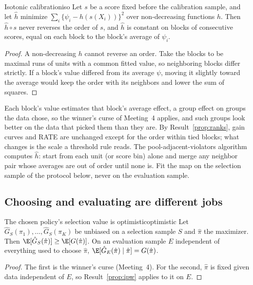 \documentclass[11pt]{article}
\begin{document}
\begin{prop}{Isotonic calibration}{iso}
Let $s$ be a score fixed before the calibration sample, and let $\hat h$ minimize $\sum_i\{\psi_i - h(s(X_i))\}^2$ over
non-decreasing functions $h$. Then $\hat h \circ s$ never reverses the order of $s$, and $\hat h$ is constant on blocks of
consecutive scores, equal on each block to the block's average of $\psi_i$.
\end{prop}
\begin{proof}
A non-decreasing $h$ cannot reverse an order. Take the blocks to be maximal runs of units with a common fitted value, so
neighboring blocks differ strictly. If a block's value differed from its average $\psi$, moving it slightly toward the
average would keep the order with its neighbors and lower the sum of squares.
\end{proof}

Each block's value estimates that block's average effect, a group effect on groups the data chose, so the winner's
curse of Meeting~4 applies, and such groups look better on the data that picked them than they are. By Result~\ref{prop:ranks}, gain curves and RATE are unchanged except for the order within tied blocks;
what changes is the scale a threshold rule reads. The pool-adjacent-violators algorithm computes $\hat h$: start from each
unit (or score bin) alone and merge any neighbor pair whose averages are out of order until none is. Fit the map on the
selection sample of the protocol below, never on the evaluation sample.

\subsection{Choosing and evaluating are different jobs}

\begin{prop}{The chosen policy's selection value is optimistic}{optimistic}
Let $\hat G_S(\pi_1), \dots, \hat G_S(\pi_K)$ be unbiased on a selection sample $S$ and $\hat\pi$ the maximizer. Then
$\E[\hat G_S(\hat\pi)] \ge \E[G(\hat\pi)]$. On an evaluation sample $E$ independent of everything used to choose $\hat\pi$,
$\E[\hat G_E(\hat\pi) \mid \hat\pi] = G(\hat\pi)$.
\end{prop}
\begin{proof}
The first is the winner's curse (Meeting~4). For the second, $\hat\pi$ is fixed given data independent of $E$, so
Result~\ref{prop:ipw} applies to it on $E$.
\end{proof}
\end{document}
